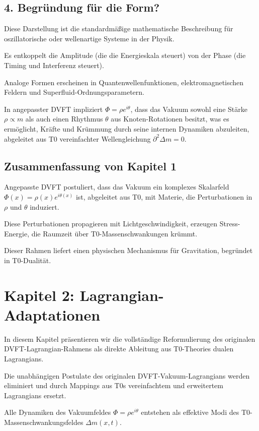 	\subsection{4. Begründung für die Form?}
	
	Diese Darstellung ist die standardmäßige mathematische Beschreibung für oszillatorische oder wellenartige Systeme in der Physik.
	
	Es entkoppelt die Amplitude (die die Energieskala steuert) von der Phase (die Timing und Interferenz steuert).
	
	Analoge Formen erscheinen in Quantenwellenfunktionen, elektromagnetischen Feldern und Superfluid-Ordnungsparametern.
	
	In angepasster DVFT impliziert $\Phi = \rho e^{i\theta}$, dass das Vakuum sowohl eine Stärke $\rho \propto m$ als auch einen Rhythmus $\theta$ aus Knoten-Rotationen besitzt, was es ermöglicht, Kräfte und Krümmung durch seine internen Dynamiken abzuleiten, abgeleitet aus T0 vereinfachter Wellengleichung $\partial^2 \Delta m = 0$.
	
	\subsection{Zusammenfassung von Kapitel 1}
	
	Angepasste DVFT postuliert, dass das Vakuum ein komplexes Skalarfeld $\Phi(x) = \rho(x) e^{i\theta(x)}$ ist, abgeleitet aus T0, mit Materie, die Perturbationen in $\rho$ und $\theta$ induziert.
	
	Diese Perturbationen propagieren mit Lichtgeschwindigkeit, erzeugen Stress-Energie, die Raumzeit über T0-Massenschwankungen krümmt.
	
	Dieser Rahmen liefert einen physischen Mechanismus für Gravitation, begründet in T0-Dualität.
	
	\section{Kapitel 2: Lagrangian-Adaptationen}
	
	In diesem Kapitel präsentieren wir die vollständige Reformulierung des originalen DVFT-Lagrangian-Rahmens als direkte Ableitung aus T0-Theories dualen Lagrangians.
	
	Die unabhängigen Postulate des originalen DVFT-Vakuum-Lagrangians werden eliminiert und durch Mappings aus T0s vereinfachtem und erweitertem Lagrangians ersetzt.
	
	Alle Dynamiken des Vakuumfeldes $\Phi = \rho e^{i\theta}$ entstehen als effektive Modi des T0-Massenschwankungsfeldes $\Delta m(x,t)$.
	
